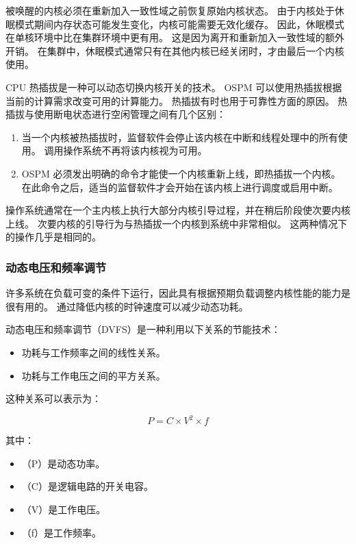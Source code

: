 被唤醒的内核必须在重新加入一致性域之前恢复原始内核状态。
由于内核处于休眠模式期间内存状态可能发生变化，内核可能需要无效化缓存。
因此，休眠模式在单核环境中比在集群环境中更有用。
这是因为离开和重新加入一致性域的额外开销。
在集群中，休眠模式通常只有在其他内核已经关闭时，才由最后一个内核使用。


CPU 热插拔是一种可以动态切换内核开关的技术。
OSPM 可以使用热插拔根据当前的计算需求改变可用的计算能力。
热插拔有时也用于可靠性方面的原因。
热插拔与使用断电状态进行空闲管理之间有几个区别：

\begin{enumerate}
\item
  当一个内核被热插拔时，监督软件会停止该内核在中断和线程处理中的所有使用。
  调用操作系统不再将该内核视为可用。
\item
  OSPM 必须发出明确的命令才能使一个内核重新上线，即热插拔一个内核。
  在此命令之后，适当的监督软件才会开始在该内核上进行调度或启用中断。
\end{enumerate}

操作系统通常在一个主内核上执行大部分内核引导过程，并在稍后阶段使次要内核上线。
次要内核的引导行为与热插拔一个内核到系统中非常相似。
这两种情况下的操作几乎是相同的。

\subsubsection{动态电压和频率调节}\label{sec:pm-dyn-vol-freq-scale}

许多系统在负载可变的条件下运行，因此具有根据预期负载调整内核性能的能力是很有用的。
通过降低内核的时钟速度可以减少动态功耗。

动态电压和频率调节（DVFS）是一种利用以下关系的节能技术：

\begin{itemize}
\item
  功耗与工作频率之间的线性关系。
\item
  功耗与工作电压之间的平方关系。
\end{itemize}

这种关系可以表示为：

$$ P = C \times V^2 \times f $$

其中：
\begin{itemize}
\item
（P）是动态功率。
\item
（C）是逻辑电路的开关电容。
\item
（V）是工作电压。
\item
（f）是工作频率。
\end{itemize}

